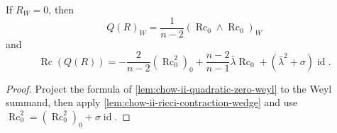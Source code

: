 \begin{corollary}
  \label{cor:chow-ii-zero-weyl-quadratic-components}
  If \(R_W=0\), then
  \[
  Q(R)_W=\frac1{n-2}(\operatorname{Rc}_0\wedge\operatorname{Rc}_0)_W
  \]
  and
  \[
  \operatorname{Rc}(Q(R))=-\frac2{n-2}(\operatorname{Rc}_0^2)_0
   +\frac{n-2}{n-1}\bar\lambda\operatorname{Rc}_0
   +(\bar\lambda^2+\sigma)\operatorname{id}.
  \]
\end{corollary}
\begin{proof}
\sketch
  Project the formula of \ref{lem:chow-ii-quadratic-zero-weyl} to the Weyl
  summand, then apply \ref{lem:chow-ii-ricci-contraction-wedge} and use
  \(\operatorname{Rc}_0^2=(\operatorname{Rc}_0^2)_0+\sigma\operatorname{id}\).
\end{proof}

